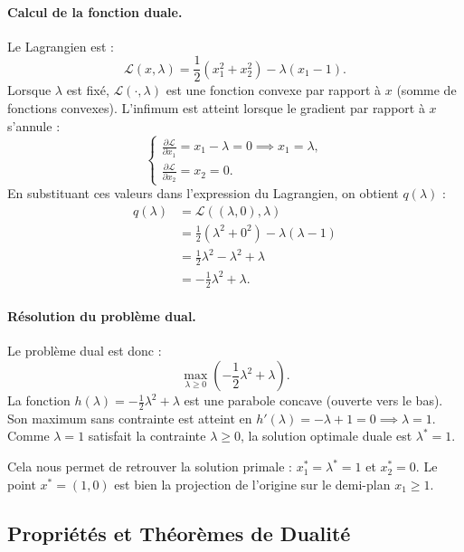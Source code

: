 \paragraph{Calcul de la fonction duale.}
Le Lagrangien est :
\begin{equation}
    \mathcal{L}(x, \lambda) = \frac{1}{2}(x_1^2 + x_2^2) - \lambda(x_1 - 1).
\end{equation}
Lorsque $\lambda$ est fixé, $\mathcal{L}(\cdot, \lambda)$ est une fonction convexe par rapport à $x$ (somme de fonctions convexes). L'infimum est atteint lorsque le gradient par rapport à $x$ s'annule :
\begin{equation}
    \begin{cases}
        \frac{\partial \mathcal{L}}{\partial x_1} = x_1 - \lambda = 0 \implies x_1 = \lambda, \\
        \frac{\partial \mathcal{L}}{\partial x_2} = x_2 = 0.
    \end{cases}
\end{equation}
En substituant ces valeurs dans l'expression du Lagrangien, on obtient $q(\lambda)$ :
\begin{align}
    q(\lambda) &= \mathcal{L}((\lambda, 0), \lambda) \\
    &= \frac{1}{2}(\lambda^2 + 0^2) - \lambda(\lambda - 1) \\
    &= \frac{1}{2}\lambda^2 - \lambda^2 + \lambda \\
    &= -\frac{1}{2}\lambda^2 + \lambda.
\end{align}

\paragraph{Résolution du problème dual.}
Le problème dual est donc :
\begin{equation}
    \max_{\lambda \geq 0} \left( -\frac{1}{2}\lambda^2 + \lambda \right).
\end{equation}
La fonction $h(\lambda) = -\frac{1}{2}\lambda^2 + \lambda$ est une parabole concave (ouverte vers le bas). Son maximum sans contrainte est atteint en $h'(\lambda) = -\lambda + 1 = 0 \implies \lambda = 1$.
Comme $\lambda = 1$ satisfait la contrainte $\lambda \geq 0$, la solution optimale duale est $\lambda^* = 1$.

Cela nous permet de retrouver la solution primale : $x^*_1 = \lambda^* = 1$ et $x^*_2 = 0$.
Le point $x^* = (1, 0)$ est bien la projection de l'origine sur le demi-plan $x_1 \geq 1$.

\subsection{Propriétés et Théorèmes de Dualité}

